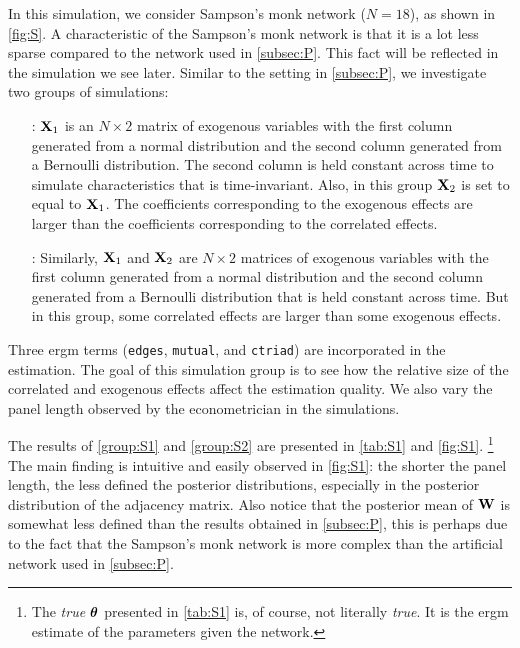 \documentclass[a4paper]{article}
\begin{document}



In this simulation, we consider Sampson's monk network ($N=18$), as shown in \autoref{fig:S}.
A characteristic of the Sampson's monk network is that it is a lot less sparse compared to the network used in \autoref{subsec:P}.
This fact will be reflected in the simulation we see later.
Similar to the setting in \autoref{subsec:P},
we investigate two groups of simulations:
\begin{enumerate}[leftmargin=\widthof{Group S1: }]
	\item[\itemlabel{group:S1}{Group S1}:]
		$\mathbf{X}_1$ is an $N\times 2$ matrix of exogenous variables
		with the first column generated from a normal distribution and the second column generated from a Bernoulli distribution.
		The second column is held constant across time to simulate characteristics that is time-invariant.
		Also, in this group $\mathbf{X}_{2}$ is set to equal to $\mathbf{X}_{1}$.
		The coefficients corresponding to the exogenous effects are larger than the coefficients corresponding to the correlated effects.
	\item[\itemlabel{group:S2}{Group S2}:]
		Similarly,
		$\mathbf{X}_1$ and $\mathbf{X}_2$ are $N\times 2$ matrices of exogenous variables
		with the first column generated from a normal distribution
		and the second column generated from a Bernoulli distribution that is held constant across time.
		But in this group,
		some correlated effects are larger than some exogenous effects.
\end{enumerate}
Three \gls{ergm} terms
(\Verb"edges", \Verb"mutual", and \Verb"ctriad") are incorporated in the estimation.
The goal of this simulation group is to see how the relative size of the correlated and exogenous effects affect the estimation quality.
We also vary the panel length observed by the econometrician in the simulations.

The results of \ref{group:S1} and \ref{group:S2} are presented in \autoref{tab:S1} and \autoref{fig:S1}.
\footnote{
	The \emph{true} $\boldsymbol{\theta}$ presented in \autoref{tab:S1} is, of course, not literally \emph{true}.
	It is the \gls{ergm} estimate of the parameters given the network.
}
The main finding is intuitive and easily observed in \autoref{fig:S1}:
the shorter the panel length,
the less defined the posterior distributions, especially in the posterior distribution of the adjacency matrix.
Also notice that the posterior mean of $\mathbf{W}$ is somewhat less defined than the results obtained in \autoref{subsec:P},
this is perhaps due to the fact that the Sampson's monk network is more complex than the artificial network used in \autoref{subsec:P}.
\end{document}
